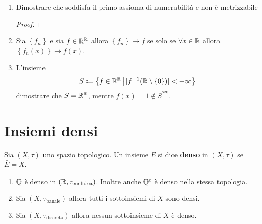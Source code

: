 \begin{remark}
\begin{enumerate}
		\item Dimostrare che soddisfa il primo assioma di numerabilità e non è metrizzabile
		\begin{proof}
		\end{proof}
		\item Sia $\left\{f_n\right\}$ e sia $f \in \mathbb{R}^{\mathbb{R}}$ allora $\left\{f_n\right\} \rightarrow f$ se solo se $\forall x \in \mathbb{R}$ allora $\left\{f_n(x)\right\} \rightarrow f(x)$.
		\item L'insieme 
		\begin{equation*}
			S \coloneqq \left\{ f \in \mathbb{R}^{\mathbb{R}} \,\middle|\, |f^{-1}(\mathbb{R} \setminus \left\{0\right\})| < +\infty \right\}
		\end{equation*}
		dimostrare che $\bar{S} = \mathbb{R}^{\mathbb{R}}$, mentre $f(x)= 1 \notin \bar{S}^\text{seq}$.
	\end{enumerate}
	\end{remark}

\section{Insiemi densi}

\begin{definition}
	Sia $(X,\tau)$ uno spazio topologico. Un insieme $E$ si dice \textbf{denso} in $(X, \tau)$ se $\bar{E} = X$. 
\end{definition}

\begin{example}
\begin{enumerate}
	\item $\mathbb{Q}$ è denso in $(\mathbb{R}, \tau_{\text{euclidea}})$. Inoltre anche $\mathbb{Q}^c$ è denso nella stessa topologia.
	\item Sia $(X,\tau_{\text{banale}})$ allora tutti i sottoinsiemi di $X$ sono densi.
	\item Sia $(X,\tau_{\text{discreta}})$ allora nessun sottoinsieme di $X$ è denso.
\end{enumerate}
\end{example}


